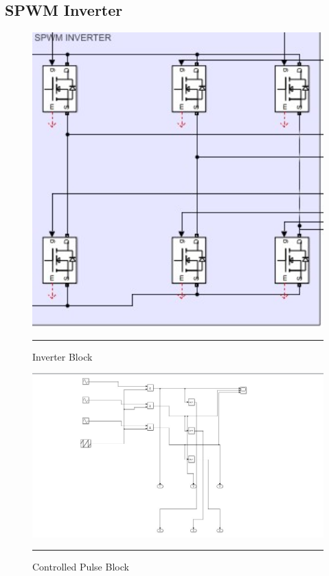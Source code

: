 \subsection{SPWM Inverter}
\begin{figure}[htbp]
	\centering
	\includegraphics[width = 6in]{./Figures/Inverter.jpg}
	\rule{35em}{1pt}
	\caption{Inverter Block}
\end{figure}

\begin{figure}[htbp]
	\centering
	\includegraphics[width = 6in]{./Figures/Inverter1.jpg}
	\rule{35em}{1pt}
	\caption{Controlled Pulse Block}
\end{figure}
\newpage
